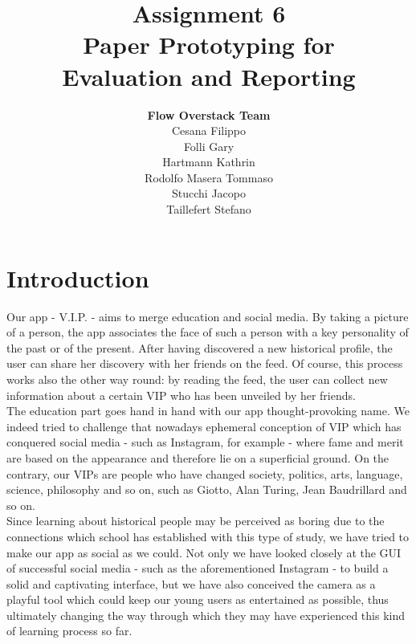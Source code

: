 \documentclass[12pt]{scrartcl}
\title{Assignment 6\\ Paper Prototyping for\\ Evaluation and Reporting}
\author{\textbf{Flow Overstack Team}\\ Cesana Filippo\\ Folli Gary\\ Hartmann Kathrin\\ Rodolfo Masera Tommaso\\ Stucchi Jacopo\\ Taillefert Stefano}
\date{}
\begin{document}
\maketitle

\tableofcontents

\newpage

\section{Introduction}

	
	Our app - V.I.P. - aims to merge education and social media. By taking a picture of a person, the app associates the face of such a person with a key personality of the past or of the present. After having discovered a new historical profile, the user can share her discovery with her friends on the feed. Of course, this process works also the other way round: by reading the feed, the user can collect new information about a certain VIP who has been unveiled by her friends.\\
	
	The education part goes hand in hand with our app thought-provoking name. We indeed tried to challenge that nowadays ephemeral conception of VIP which has conquered social media - such as Instagram, for example - where fame and merit are based on the appearance and therefore lie on a superficial ground. On the contrary, our VIPs are people who have changed society, politics, arts, language, science, philosophy and so on, such as Giotto, Alan Turing, Jean Baudrillard and so on.\\
	
	Since learning about historical people may be perceived as boring due to the connections which school has established with this type of study, we have tried to make our app as social as we could. Not only we have looked closely at the GUI of successful social media - such as the aforementioned Instagram - to build a solid and captivating interface, but we have also conceived the camera as a playful tool which could keep our young users as entertained as possible, thus ultimately changing the way through which they may have experienced this kind of learning process so far.\\
	
\end{document}

